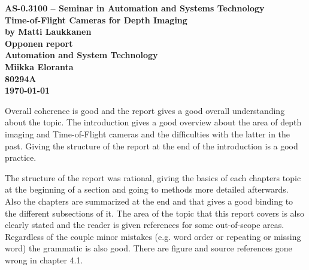 \documentclass[a4paper,english,12pt]{article}
\begin{document}
\thispagestyle{empty}

\begin{titlepage}
    \centering
    \vspace*{5\baselineskip}
    \bfseries
    \normalsize
    AS-0.3100 -- Seminar in Automation and Systems Technology \\
    \vspace{3\baselineskip}
    \Large
    Time-of-Flight Cameras for Depth Imaging \\
   	\vspace*{\baselineskip}
    \normalsize
    by Matti Laukkanen \\
    \vspace*{3\baselineskip}
    \Large
    Opponen report \\ 
    \vspace*{\baselineskip}
    \normalfont
    \vfill
    \small
    Automation and System Technology \\
    \vfill
    Miikka Eloranta \\
    80294A \\[2\baselineskip]
    \textbf{\today} \\[2\baselineskip]
    \vfill


\end{titlepage}


Overall coherence is good and the report gives a good overall understanding about the topic. The introduction gives a good overview about the area of depth imaging and Time-of-Flight cameras and the difficulties with the latter in the past. Giving the structure of the report at the end of the introduction is a good practice.

The structure of the report was rational, giving the basics of each chapters topic at the beginning of a section and going to methods more detailed afterwards. Also the chapters are summarized at the end and that gives a good binding to the different subsections of it. The area of the topic that this report covers is also clearly stated and the reader is given references for some out-of-scope areas. Regardless of the couple minor mistakes (e.g. word order or repeating or missing word) the grammatic is also good. There are figure and source references gone wrong in chapter 4.1.  

\end{document}
